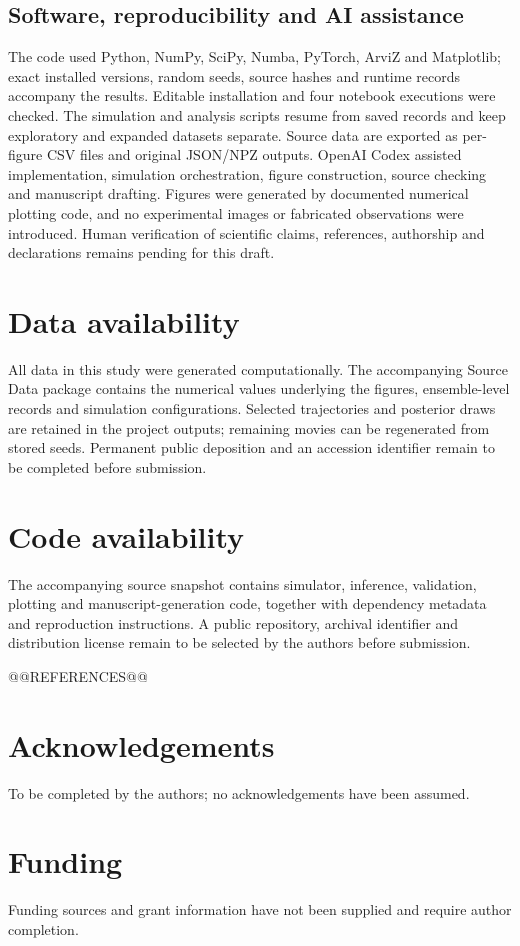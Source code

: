 \documentclass[12pt]{article}
\begin{document}
\subsection*{Software, reproducibility and AI assistance}
The code used Python, NumPy, SciPy, Numba, PyTorch, ArviZ and Matplotlib; exact installed versions, random seeds, source hashes and runtime records accompany the results. Editable installation and four notebook executions were checked. The simulation and analysis scripts resume from saved records and keep exploratory and expanded datasets separate. Source data are exported as per-figure CSV files and original JSON/NPZ outputs. OpenAI Codex assisted implementation, simulation orchestration, figure construction, source checking and manuscript drafting. Figures were generated by documented numerical plotting code, and no experimental images or fabricated observations were introduced. Human verification of scientific claims, references, authorship and declarations remains pending for this draft.

\section*{Data availability}
All data in this study were generated computationally. The accompanying Source Data package contains the numerical values underlying the figures, ensemble-level records and simulation configurations. Selected trajectories and posterior draws are retained in the project outputs; remaining movies can be regenerated from stored seeds. Permanent public deposition and an accession identifier remain to be completed before submission.

\section*{Code availability}
The accompanying source snapshot contains simulator, inference, validation, plotting and manuscript-generation code, together with dependency metadata and reproduction instructions. A public repository, archival identifier and distribution license remain to be selected by the authors before submission.

@@REFERENCES@@

\section*{Acknowledgements}
To be completed by the authors; no acknowledgements have been assumed.
\section*{Funding}
Funding sources and grant information have not been supplied and require author completion.
\end{document}
